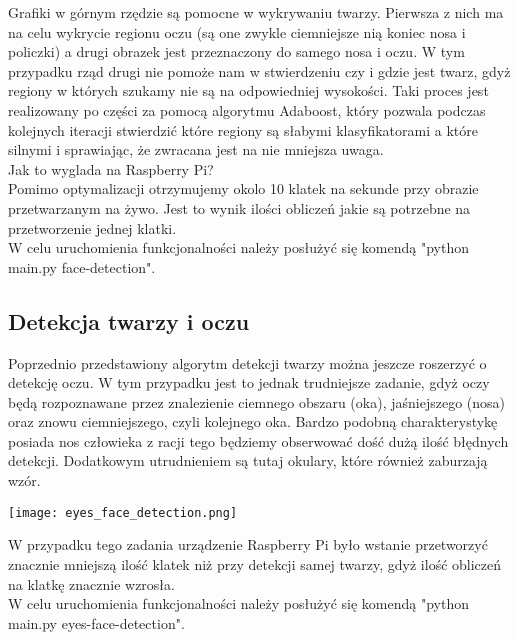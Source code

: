 \documentclass{article}
\begin{document}
Grafiki w górnym rzędzie są pomocne w wykrywaniu twarzy. Pierwsza z nich ma na celu wykrycie regionu oczu (są one zwykle ciemniejsze nią koniec nosa i policzki) a drugi obrazek jest przeznaczony do samego nosa i oczu. W tym przypadku rząd drugi nie pomoże nam w stwierdzeniu czy i gdzie jest twarz, gdyż regiony w których szukamy nie są na odpowiedniej wysokości. Taki proces jest realizowany po części za pomocą algorytmu Adaboost, który pozwala podczas kolejnych iteracji stwierdzić które regiony są słabymi klasyfikatorami a które silnymi i sprawiając, że zwracana jest na nie mniejsza uwaga.\\

Jak to wyglada na Raspberry Pi? \\
Pomimo optymalizacji otrzymujemy okolo 10 klatek na sekunde przy obrazie przetwarzanym na żywo. Jest to wynik ilości obliczeń jakie są potrzebne na przetworzenie jednej klatki.
\\
W celu uruchomienia funkcjonalności należy posłużyć się komendą "python main.py face-detection".

\subsection{Detekcja twarzy i oczu}
Poprzednio przedstawiony algorytm detekcji twarzy można jeszcze roszerzyć o detekcję oczu. W tym przypadku jest to jednak trudniejsze zadanie, gdyż oczy będą rozpoznawane przez znalezienie ciemnego obszaru (oka), jaśniejszego (nosa) oraz znowu ciemniejszego, czyli kolejnego oka. Bardzo podobną charakterystykę posiada nos człowieka z racji tego będziemy obserwować dość dużą ilość błędnych detekcji. Dodatkowym utrudnieniem są tutaj okulary, które również zaburzają wzór.\\

\begin{center}
    \texttt{[image: eyes\_face\_detection.png]}
\end{center}

W przypadku tego zadania urządzenie Raspberry Pi było wstanie przetworzyć znacznie mniejszą ilość klatek niż przy detekcji samej twarzy, gdyż ilość obliczeń na klatkę znacznie wzrosła.
\\
W celu uruchomienia funkcjonalności należy posłużyć się komendą "python main.py eyes-face-detection".
\end{document}
